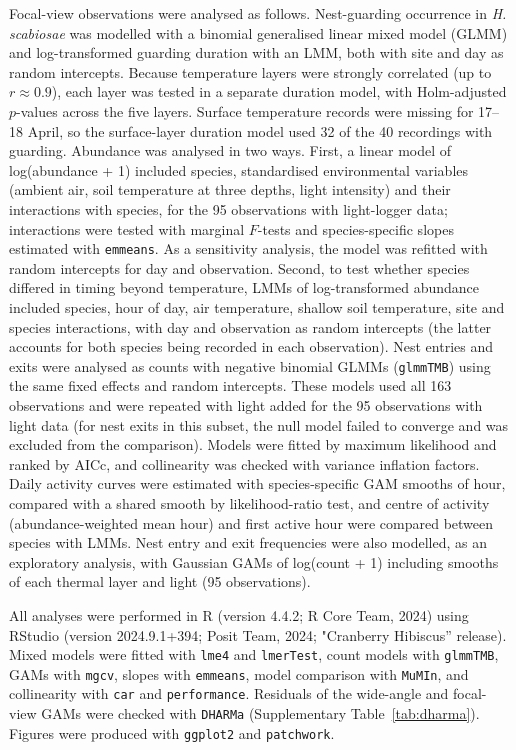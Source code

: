 \documentclass[11pt,a4paper]{article}
\begin{document}
Focal-view observations were analysed as follows. Nest-guarding occurrence in \textit{H. scabiosae} was modelled with a binomial generalised linear mixed model (GLMM) and log-transformed guarding duration with an LMM, both with site and day as random intercepts. Because temperature layers were strongly correlated (up to $r \approx 0.9$), each layer was tested in a separate duration model, with Holm-adjusted $p$-values across the five layers. Surface temperature records were missing for 17--18 April, so the surface-layer duration model used 32 of the 40 recordings with guarding. Abundance was analysed in two ways. First, a linear model of log(abundance + 1) included species, standardised environmental variables (ambient air, soil temperature at three depths, light intensity) and their interactions with species, for the 95 observations with light-logger data; interactions were tested with marginal $F$-tests and species-specific slopes estimated with \texttt{emmeans}. As a sensitivity analysis, the model was refitted with random intercepts for day and observation. Second, to test whether species differed in timing beyond temperature, LMMs of log-transformed abundance included species, hour of day, air temperature, shallow soil temperature, site and species interactions, with day and observation as random intercepts (the latter accounts for both species being recorded in each observation). Nest entries and exits were analysed as counts with negative binomial GLMMs (\texttt{glmmTMB}) using the same fixed effects and random intercepts. These models used all 163 observations and were repeated with light added for the 95 observations with light data (for nest exits in this subset, the null model failed to converge and was excluded from the comparison). Models were fitted by maximum likelihood and ranked by AICc, and collinearity was checked with variance inflation factors. Daily activity curves were estimated with species-specific GAM smooths of hour, compared with a shared smooth by likelihood-ratio test, and centre of activity (abundance-weighted mean hour) and first active hour were compared between species with LMMs. Nest entry and exit frequencies were also modelled, as an exploratory analysis, with Gaussian GAMs of log(count + 1) including smooths of each thermal layer and light (95 observations).

All analyses were performed in R (version 4.4.2; R Core Team, 2024) using RStudio (version 2024.9.1+394; Posit Team, 2024; "Cranberry Hibiscus'' release). Mixed models were fitted with \texttt{lme4} and \texttt{lmerTest}, count models with \texttt{glmmTMB}, GAMs with \texttt{mgcv}, slopes with \texttt{emmeans}, model comparison with \texttt{MuMIn}, and collinearity with \texttt{car} and \texttt{performance}. Residuals of the wide-angle and focal-view GAMs were checked with \texttt{DHARMa} (Supplementary Table~\ref{tab:dharma}). Figures were produced with \texttt{ggplot2} and \texttt{patchwork}.
\end{document}

